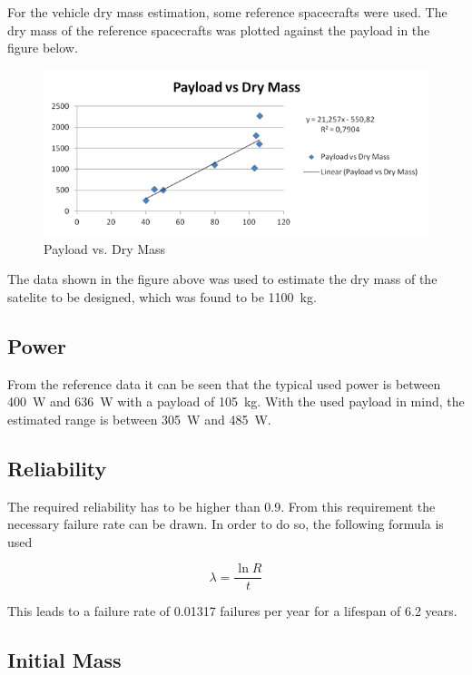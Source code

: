 For the vehicle dry mass estimation, some reference spacecrafts were
used. The dry mass of the reference spacecrafts was plotted against
the payload in the figure below.

\begin{figure}[h]
  \includegraphics[width=\textwidth]{Payload-vs-DryMass}
  \caption{Payload vs. Dry Mass}
\end{figure}

The data shown in the figure above was used to estimate the dry mass
of the satelite to be designed, which was found to be \SI{1100}{kg}.

\subsection{Power}

From the reference data it can be seen that the typical used power is
between \SI{400}{W} and \SI{636}{W} with a payload of
\SI{105}{kg}. With the used payload in mind, the estimated range is
between \SI{305}{W} and \SI{485}{W}.

\subsection{Reliability}

The required reliability has to be higher than 0.9. From this
requirement the necessary failure rate can be drawn. In order to do
so, the following formula is used

\begin{equation}
  \lambda = \frac{\ln R}{t}
\end{equation}

This leads to a failure rate of 0.01317 failures per year for a
lifespan of 6.2 years.

\subsection{Initial Mass}

